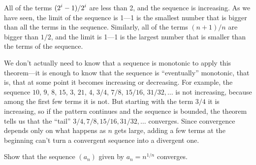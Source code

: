 \begin{example}
All of the terms $\displaystyle (2^i-1)/2^i$ are less than 2, and the sequence is
increasing. As we have seen, the limit of the sequence is 1---1 is the
smallest number that is bigger than all the terms in the sequence.
Similarly, all of the terms $(n+1)/n$ are bigger than $1/2$, and the
limit is 1---1 is the largest number that is smaller than the terms of
the sequence.
\end{example}

We don't actually need to know that a sequence is monotonic to apply
this theorem---it is enough to know that the sequence is
``eventually'' monotonic,
that is, that at some point it becomes increasing or decreasing.  For
example, the sequence $10$, $9$, $8$, $15$, $3$, $21$, $4$, $3/4$,
$7/8$, $15/16$, $31/32,\ldots$ is not increasing, because among the
first few terms it is not. But starting with the term $3/4$ it is
increasing, so if the pattern continues and the sequence is bounded,
the theorem tells us that the ``tail'' $3/4, 7/8, 15/16, 31/32,\ldots$
converges.  Since convergence depends only on what happens as $n$ gets
large, adding a few terms at the beginning can't turn a convergent
sequence into a divergent one.

\begin{example}
\label{example:nth-root-of-n}
Show that the sequence $(a_n)$ given by $a_n = n^{1/n}$ converges.
\end{example}


